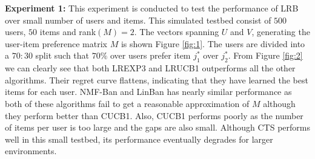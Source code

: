 \textbf{Experiment 1:} This experiment is conducted to test the performance of LRB over  small number of users and items. This simulated testbed consist of $500$ users, $50$ items and rank$(M) = 2$. The vectors spanning $U$ and $V$, generating the user-item preference matrix $M$ is shown Figure \ref{fig:1}. The users are divided into a $70:30$ split such that $70\%$ over users prefer item $j^*_1$ over $j^*_2$.  From Figure \ref{fig:2} we can clearly see that both LREXP3 and LRUCB1 outperforms all the other algorithms. Their regret curve flattens, indicating that they have learned the best items for each user.  NMF-Ban and LinBan has nearly similar performance as both of these algorithms fail to get a reasonable approximation of $M$ although they perform better than CUCB1. Also,  CUCB1 performs poorly as the number of items per user is too large and the gaps are also small. Although CTS performs well in this small testbed, its performance eventually degrades for larger environments. 


